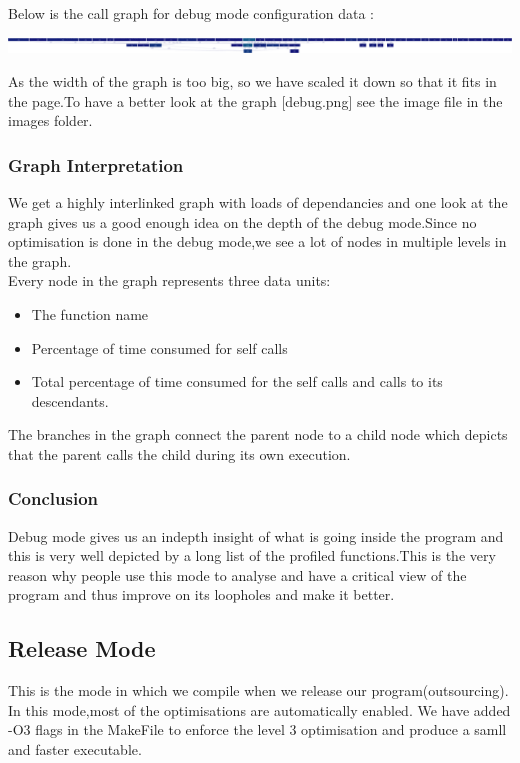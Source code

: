\documentclass[11pt]{article}
\begin{document}
Below is the call graph for debug mode configuration data :
 \begin{center}
\includegraphics[scale=0.04]
{images/debug.png}
\end{center}
 As the width of the graph is too big, so we have scaled it down so that it fits in the page.To have a better look at the graph [debug.png] see the image file in the images folder.

 \subsubsection{Graph Interpretation}
We get a highly interlinked graph with loads of dependancies and one look at the graph gives us a good enough idea on the depth of the debug mode.Since no optimisation is done in the debug mode,we see a lot of nodes in multiple levels in the graph.\\
Every node in the graph represents three data units:
\begin{itemize}
\item The function name 
\item Percentage of time consumed for self calls
\item Total percentage of time consumed for the self calls and calls to its descendants.
\end{itemize}
The branches in the graph connect the parent node to a child node which depicts that the parent calls the child during its own execution.

\subsubsection{Conclusion}
Debug mode gives us an indepth insight of what is going inside the program and this is very well depicted by a long list of the profiled functions.This is the very reason why people use this mode to analyse and have a critical view of the program and thus improve on its loopholes and make it better.

\subsection{Release Mode}
This is the mode in which we compile when we release our program(outsourcing). In this mode,most of the optimisations are automatically enabled. We have added -O3 flags in the MakeFile to enforce the level 3 optimisation and produce a samll and faster executable. 
\end{document}
